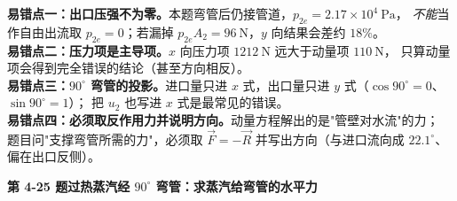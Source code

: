 \begin{yicuo}
\textbf{易错点一：出口压强不为零。}本题弯管后仍接管道，$p_{2e}=2.17\times10^4\ \mathrm{Pa}$，
\emph{不能}当作自由出流取 $p_{2e}=0$；若漏掉 $p_{2e}A_2=96\ \mathrm{N}$，$y$ 向结果会差约 $18\%$。\\
\textbf{易错点二：压力项是主导项。}$x$ 向压力项 $1212\ \mathrm{N}$ 远大于动量项 $110\ \mathrm{N}$，
只算动量项会得到完全错误的结论（甚至方向相反）。\\
\textbf{易错点三：$90^\circ$ 弯管的投影。}进口量只进 $x$ 式，出口量只进 $y$ 式（$\cos90^\circ=0$、$\sin90^\circ=1$）；
把 $u_2$ 也写进 $x$ 式是最常见的错误。\\
\textbf{易错点四：必须取反作用力并说明方向。}动量方程解出的是"管壁对水流"的力；
题目问"支撑弯管所需的力"，必须取 $\vec F=-\vec R$ 并写出方向（与进口流向成 $22.1^\circ$、偏在出口反侧）。
\end{yicuo}

\noindent\textbf{第 4-25 题\quad 过热蒸汽经 $90^\circ$ 弯管：求蒸汽给弯管的水平力}

